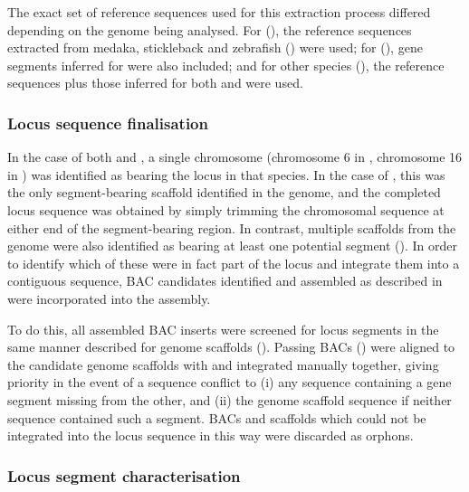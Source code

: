 The exact set of reference sequences used for this extraction process differed depending on the genome being analysed. For \nfu (), the reference sequences extracted from medaka, stickleback and zebrafish () were used; for \xma (), gene segments inferred for \Nfu were also included; and for other species (), the reference sequences plus those inferred for both \Nfu and \Xma were used.

\subsubsection{Locus sequence finalisation}
\label{sec:methods_comp_locus_final}

In the case of both \nfu and \xma, a single chromosome (chromosome 6 in \Nfu, chromosome 16 in \Xma) was identified as bearing the \igh{} locus in that species. In the case of \Xma, this was the only segment-bearing scaffold identified in the genome, and the completed locus sequence was obtained by simply trimming the chromosomal sequence at either end of the segment-bearing region. In contrast, multiple scaffolds from the \Nfu genome were also identified as bearing at least one potential \igh{} segment (). In order to identify which of these were in fact part of the locus and integrate them into a contiguous sequence, BAC candidates identified and assembled as described in  were incorporated into the assembly.

To do this, all assembled BAC inserts were screened for \igh{} locus segments in the same manner described for genome scaffolds (). Passing BACs () were aligned to the candidate genome scaffolds with  and integrated manually together, giving priority in the event of a sequence conflict to (i) any sequence containing a gene segment missing from the other, and (ii) the genome scaffold sequence if neither sequence contained such a segment. BACs and scaffolds which could not be integrated into the locus sequence in this way were discarded as orphons.

\subsubsection{Locus segment characterisation}
\label{sec:methods_comp_locus_segments}

